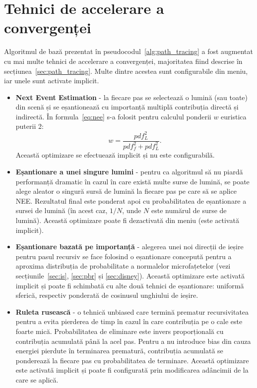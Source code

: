 \documentclass[12pt,a4paper]{report}
\numberwithin{equation}{section} %
\begin{document}
\section{Tehnici de accelerare a convergenței}\label{sec:options}
Algoritmul de bază prezentat în pseudocodul~\ref{alg:path_tracing} a fost
augmentat cu mai multe tehnici de accelerare a convergenței, majoritatea fiind
descrise în secțiunea~\ref{sec:path_tracing}. Multe dintre acestea sunt configurabile
din meniu, iar unele sunt activate implicit.
\begin{itemize}
	\item \textbf{Next Event Estimation} - la fiecare pas se selectează o lumină (sau toate)
	      din scenă și se eșantionează cu importanță multiplă contribuția directă și indirectă.
	      În formula~\ref{eq:nee} s-a folosit pentru calculul ponderii $w$ euristica puterii 2:
	      \begin{equation}
		      w = \dfrac{pdf_L^2}{pdf_f^2 + pdf_L^2}.
	      \end{equation}
	      Această optimizare se efectuează implicit și nu este configurabilă.
	\item \textbf{Eșantionare a unei singure lumini} - pentru ca algoritmul să nu piardă
	      performanță dramatic în cazul în care există multe surse de lumină, se poate alege
	      aleator o singură sursă de lumină la fiecare pas pe care să se aplice NEE. Rezultatul
	      final este ponderat apoi cu probabilitatea de eșantionare a sursei de lumină (în acest
	      caz, $1/N$, unde $N$ este numărul de surse de lumină). Această optimizare poate
	      fi dezactivată din meniu (este activată implicit).
	\item \textbf{Eșantionare bazată pe importanță} - alegerea unei noi direcții de ieșire
	      pentru pasul recursiv se face folosind o eșantionare concepută pentru a aproxima
	      distribuția de probabilitate a normalelor microfațetelor (vezi secțiunile~\ref{sec:is}, \ref{sec:pbr} și \ref{sec:disney}).
	      Această optimizare este activată implicit și poate fi schimbată cu alte două
	      tehnici de eșantionare: uniformă sferică, respectiv ponderată de cosinusul unghiului
	      de ieșire.
	\item \textbf{Ruleta rusească} - o tehnică unbiased care termină prematur
	      recursivitatea pentru a evita pierderea de timp în cazul în care contribuția pe o cale
	      este foarte mică. Probabilitatea de eliminare este invers proporțională cu
	      contribuția acumulată până la acel pas. Pentru a nu introduce bias din cauza
	      energiei pierdute în terminarea prematură, contribuția acumulată se
	      ponderează la fiecare pas cu probabilitatea de terminare.
	      Această optimizare este activată implicit și poate fi configurată
	      prin modificarea adâncimii de la care se aplică.
\end{itemize}
\end{document}
